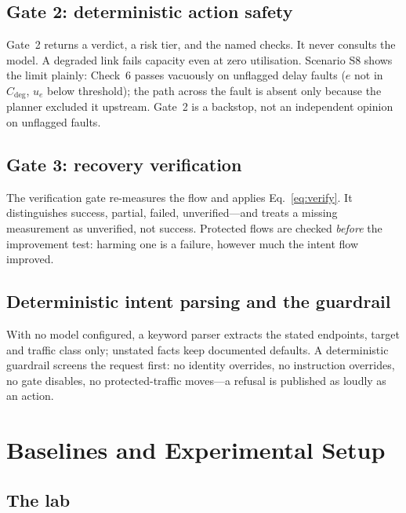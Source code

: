 \documentclass[conference]{IEEEtran}
\begin{document}
\subsection{Gate 2: deterministic action safety}

Gate~2 returns a verdict, a risk tier, and the named checks. It never
consults the model. A degraded link fails capacity even at zero utilisation.
Scenario S8 shows the limit plainly: Check~6 passes vacuously on unflagged
delay faults ($e$ not in $C_{\mathrm{deg}}$, $u_e$ below threshold); the
path across the fault is absent only because the planner excluded it
upstream. Gate~2 is a backstop, not an independent opinion on unflagged
faults.

\subsection{Gate 3: recovery verification}

The verification gate re-measures the flow and applies Eq.~\eqref{eq:verify}.
It distinguishes success, partial, failed, unverified---and treats a missing
measurement as unverified, not success. Protected flows are checked
\emph{before} the improvement test: harming one is a failure, however much
the intent flow improved.

\subsection{Deterministic intent parsing and the guardrail}

With no model configured, a keyword parser extracts the stated endpoints,
target and traffic class only; unstated facts keep documented defaults. A
deterministic guardrail screens the request first: no identity overrides, no
instruction overrides, no gate disables, no protected-traffic moves---a
refusal is published as loudly as an action.

\section{Baselines and Experimental Setup}

\subsection{The lab}
\end{document}
